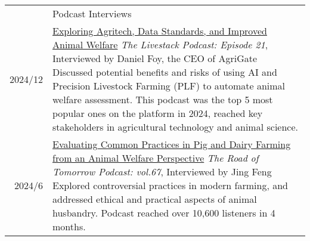 \documentclass[letterpaper, 11pt]{article}
\newcommand{\headingfont}{\Large\color{OliveGreen}}
\newenvironment{SectionTable}[1]{
	\renewcommand*{\arraystretch}{1.7}
	\setlength{\tabcolsep}{10pt}
	\begin{longtable}{Rp{5.2in}} & #1 \\}
{\end{longtable}\vspace{-.3cm}}
\begin{document}
\begin{SectionTable}{\headingfont Podcast Interviews}
2024/12 &
\href{https://agrigates.io/the-livestack-podcast-episode-21-exploring-agritech-data-standards-and-improved-animal-welfare/}{Exploring Agritech, Data Standards, and Improved Animal Welfare} \newline
\textit{The Livestack Podcast: Episode 21}, Interviewed by Daniel Foy, the CEO of AgriGate \newline
Discussed potential benefits and risks of using AI and Precision Livestock Farming (PLF) to automate animal welfare assessment. This podcast was the top 5 most popular ones on the platform in 2024, reached key stakeholders in agricultural technology and animal science. \\
2024/6 &
\href{https://www.xiaoyuzhoufm.com/episode/665f3a85b9bead9fb0b78038?s=eyJ1IjoiNWZhY2EwOWZlMGY1ZTcyM2JiYzNh}{Evaluating Common Practices in Pig and Dairy Farming from an Animal Welfare Perspective} \newline
\textit{The Road of Tomorrow Podcast: vol.67}, Interviewed by Jing Feng \newline
Explored controversial practices in modern farming, and addressed ethical and practical aspects of animal husbandry. Podcast reached over 10,600 listeners in 4 months. \\
\end{SectionTable}
\end{document}
